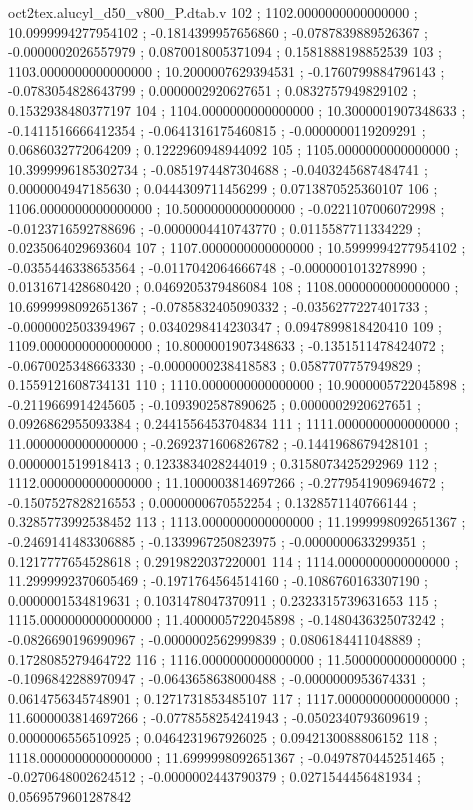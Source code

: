 \begin{filecontents}[overwrite]{oct2tex.alucyl_d50_v800_P.dtab.v}
102 ; 1102.0000000000000000 ; 10.0999994277954102 ; -0.1814399957656860 ; -0.0787839889526367 ; -0.0000002026557979 ; 0.0870018005371094 ; 0.1581888198852539
103 ; 1103.0000000000000000 ; 10.2000007629394531 ; -0.1760799884796143 ; -0.0783054828643799 ; 0.0000002920627651 ; 0.0832757949829102 ; 0.1532938480377197
104 ; 1104.0000000000000000 ; 10.3000001907348633 ; -0.1411516666412354 ; -0.0641316175460815 ; -0.0000000119209291 ; 0.0686032772064209 ; 0.1222960948944092
105 ; 1105.0000000000000000 ; 10.3999996185302734 ; -0.0851974487304688 ; -0.0403245687484741 ; 0.0000004947185630 ; 0.0444309711456299 ; 0.0713870525360107
106 ; 1106.0000000000000000 ; 10.5000000000000000 ; -0.0221107006072998 ; -0.0123716592788696 ; -0.0000004410743770 ; 0.0115587711334229 ; 0.0235064029693604
107 ; 1107.0000000000000000 ; 10.5999994277954102 ; -0.0355446338653564 ; -0.0117042064666748 ; -0.0000001013278990 ; 0.0131671428680420 ; 0.0469205379486084
108 ; 1108.0000000000000000 ; 10.6999998092651367 ; -0.0785832405090332 ; -0.0356277227401733 ; -0.0000002503394967 ; 0.0340298414230347 ; 0.0947899818420410
109 ; 1109.0000000000000000 ; 10.8000001907348633 ; -0.1351511478424072 ; -0.0670025348663330 ; -0.0000000238418583 ; 0.0587707757949829 ; 0.1559121608734131
110 ; 1110.0000000000000000 ; 10.9000005722045898 ; -0.2119669914245605 ; -0.1093902587890625 ; 0.0000002920627651 ; 0.0926862955093384 ; 0.2441556453704834
111 ; 1111.0000000000000000 ; 11.0000000000000000 ; -0.2692371606826782 ; -0.1441968679428101 ; 0.0000001519918413 ; 0.1233834028244019 ; 0.3158073425292969
112 ; 1112.0000000000000000 ; 11.1000003814697266 ; -0.2779541909694672 ; -0.1507527828216553 ; 0.0000000670552254 ; 0.1328571140766144 ; 0.3285773992538452
113 ; 1113.0000000000000000 ; 11.1999998092651367 ; -0.2469141483306885 ; -0.1339967250823975 ; -0.0000000633299351 ; 0.1217777654528618 ; 0.2919822037220001
114 ; 1114.0000000000000000 ; 11.2999992370605469 ; -0.1971764564514160 ; -0.1086760163307190 ; 0.0000001534819631 ; 0.1031478047370911 ; 0.2323315739631653
115 ; 1115.0000000000000000 ; 11.4000005722045898 ; -0.1480436325073242 ; -0.0826690196990967 ; -0.0000002562999839 ; 0.0806184411048889 ; 0.1728085279464722
116 ; 1116.0000000000000000 ; 11.5000000000000000 ; -0.1096842288970947 ; -0.0643658638000488 ; -0.0000000953674331 ; 0.0614756345748901 ; 0.1271731853485107
117 ; 1117.0000000000000000 ; 11.6000003814697266 ; -0.0778558254241943 ; -0.0502340793609619 ; 0.0000006556510925 ; 0.0464231967926025 ; 0.0942130088806152
118 ; 1118.0000000000000000 ; 11.6999998092651367 ; -0.0497870445251465 ; -0.0270648002624512 ; -0.0000002443790379 ; 0.0271544456481934 ; 0.0569579601287842

\end{filecontents}
